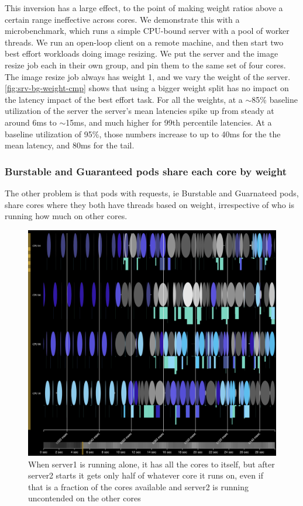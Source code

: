 This inversion has a large effect, to the point of making weight ratios above a
certain range ineffective across cores. We demonstrate this with a
microbenchmark, which runs a simple CPU-bound server with a pool of worker
threads. We run an open-loop client on a remote machine, and then start two best
effort workloads doing image resizing. We put the server and the image resize
job each in their own \cgroups{} group, and pin them to the same set of four
cores. The image resize job always has weight 1, and we vary the weight of the
server. \autoref{fig:srv-bg-weight-cmp} shows that using a bigger weight split
has no impact on the latency impact of the best effort task. For all the
weights, at a $\sim$85\% baseline utilization of the server the server's mean
latencies spike up from steady at around 6ms to $\sim$15ms, and much higher for
99th percentile latencies. At a baseline utilization of 95\%, those numbers
increase to up to 40ms for the the mean latency, and 80ms for the tail.


\subsubsection{Burstable and Guaranteed pods share each core by weight}

The other problem is that pods with requests, ie Burstable and Guarnateed pods,
share cores where they both have threads based on weight, irrespective of who is
running how much on other cores.


\begin{figure}[t]
    \centering
    \includegraphics[width=\columnwidth]{graphs/schedviz-lc-burst-problem.png}
    \caption{When server1 is running alone, it has all the cores to itself, but
    after server2 starts it gets only half of whatever core it runs on, even if
    that is a fraction of the cores available and server2 is running uncontended
    on the other cores}\label{fig:schedviz-lc-burst-problem}
\end{figure}

